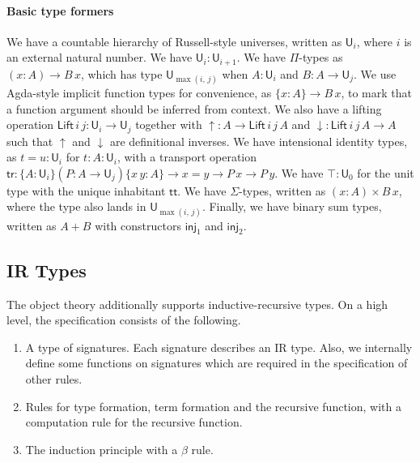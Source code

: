 \documentclass[acmsmall,screen,review,anonymous]{acmart}
\newcommand{\msf}[1]{{\mathsf{#1}}}
\newcommand{\U}{\msf{U}}
\newcommand{\Lift}{\msf{Lift}}
\newcommand{\lup}{\uparrow}
\newcommand{\ldown}{\downarrow}
\newcommand{\ttt}{\msf{tt}}
\newcommand{\inj}{\msf{inj}}
\newcommand{\tr}{\msf{tr}}
\begin{document}
\paragraph{Basic type formers}
We have a countable hierarchy of Russell-style universes, written as $\U_i$, where $i$ is an
external natural number. We have $\U_i : \U_{i + 1}$. We have $\Pi$-types as $(x : A) \to B\,x$,
which has type $\U_{\max(i,\,j)}$ when $A : \U_i$ and $B : A \to \U_j$. We use Agda-style implicit
function types for convenience, as $\{x : A\} \to B\,x$, to mark that a function argument should be
inferred from context. We also have a lifting operation $\Lift\,i\,j : \U_i \to \U_j$ together with
$\lup : A \to \Lift\,i\,j\,A$ and $\ldown : \Lift\,i\,j\,A \to A$ such that $\lup$ and $\ldown$ are
definitional inverses. We have intensional identity types, as $t = u : \U_i$ for $t : A : \U_i$,
with a transport operation $\tr : \{A : \U_i\}(P : A \to \U_j)\{x\,y : A\} \to x = y \to P\,x \to
P\,y$. We have $\top : \U_0$ for the unit type with the unique inhabitant $\ttt$. We have
$\Sigma$-types, written as $(x : A) \times B\,x$, where the type also lands in
$\U_{\max(i,\,j)}$. Finally, we have binary sum types, written as $A + B$ with constructors $\inj_1$
and $\inj_2$.


\subsection{IR Types}
The object theory additionally supports inductive-recursive types. On a high level, the specification consists
of the following.
\begin{enumerate}
\item A type of signatures. Each signature describes an IR type. Also, we internally define some
  functions on signatures which are required in the specification of other rules.
\item Rules for type formation, term formation and the recursive function, with a computation rule
  for the recursive function.
\item The induction principle with a $\beta$ rule.
\end{enumerate}
\end{document}
